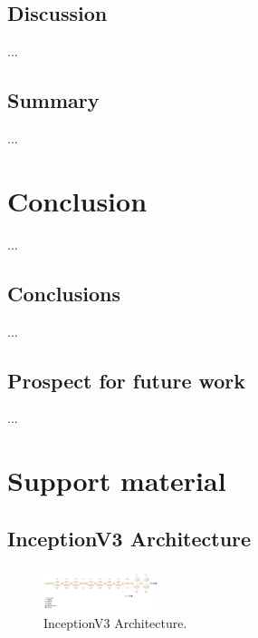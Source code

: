 \documentclass[
  twoside,
  11pt, a4paper,
  footinclude=true,
  headinclude=true,
  cleardoublepage=empty
]{scrbook}
\begin{document}
    \section{Discussion} \label{experiments:discussion}
      ...

    \section{Summary} \label{experiments:summary}
      ...

  \chapter{Conclusion} \label{conclusion}
    ...

    \section{Conclusions} \label{conclusion:conclusions}
      ...

    \section{Prospect for future work} \label{conclusion:future-work}
      ...



  

  \printindex


    \chapter{Support material} \label{support-material}
      \section{InceptionV3 Architecture} \label{appendix:inception-v3}
        \begin{figure}[h]
          \centering
          \includegraphics[angle=90,width=0.3\textwidth]{"./img/inception-v3"}
          \caption[InceptionV3 Architecture]{InceptionV3 Architecture.}
        \end{figure}
\end{document}

